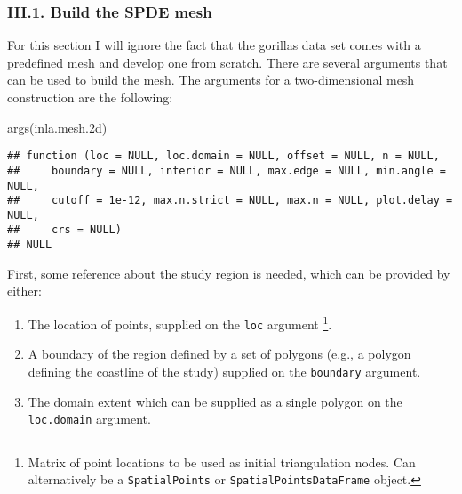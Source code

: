 \documentclass[
]{article}
\newenvironment{Shaded}{\begin{snugshade}}{\end{snugshade}}
\newcommand{\FloatTok}[1]{\textcolor[rgb]{0.00,0.00,0.81}{#1}}
\newcommand{\FunctionTok}[1]{\textcolor[rgb]{0.00,0.00,0.00}{#1}}
\newcommand{\NormalTok}[1]{#1}
\providecommand{\tightlist}{%
  \setlength{\itemsep}{0pt}\setlength{\parskip}{0pt}}
\begin{document}
\hypertarget{iii.1.-build-the-spde-mesh}{%
\subsubsection{III.1. Build the SPDE
mesh}\label{iii.1.-build-the-spde-mesh}}

For this section I will ignore the fact that the gorillas data set comes
with a predefined mesh and develop one from scratch. There are several
arguments that can be used to build the mesh. The arguments for a
two-dimensional mesh construction are the following:

\begin{Shaded}
\begin{Highlighting}[]
\FunctionTok{args}\NormalTok{(inla.mesh}\FloatTok{.2}\NormalTok{d)}
\end{Highlighting}
\end{Shaded}

\begin{verbatim}
## function (loc = NULL, loc.domain = NULL, offset = NULL, n = NULL, 
##     boundary = NULL, interior = NULL, max.edge = NULL, min.angle = NULL, 
##     cutoff = 1e-12, max.n.strict = NULL, max.n = NULL, plot.delay = NULL, 
##     crs = NULL) 
## NULL
\end{verbatim}

First, some reference about the study region is needed, which can be
provided by either:

\begin{enumerate}
\def\labelenumi{\arabic{enumi}.}
\tightlist
\item
  The location of points, supplied on the \texttt{loc} argument
  \footnote{Matrix of point locations to be used as initial
    triangulation nodes. Can alternatively be a \texttt{SpatialPoints}
    or \texttt{SpatialPointsDataFrame} object.}.
\item
  A boundary of the region defined by a set of polygons (e.g., a polygon
  defining the coastline of the study) supplied on the \texttt{boundary}
  argument.
\item
  The domain extent which can be supplied as a single polygon on the
  \texttt{loc.domain} argument.
\end{enumerate}
\end{document}
